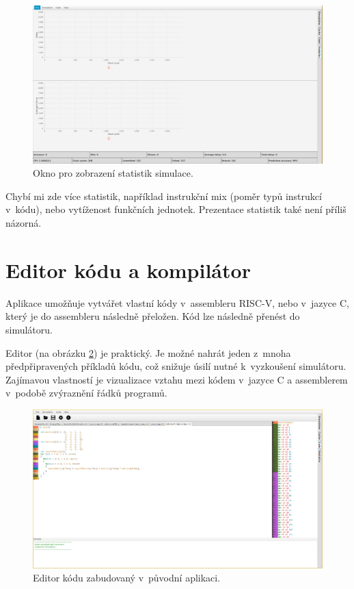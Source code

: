 \begin{figure}[hbtp]
    \includegraphics[width=\textwidth]{obrazky-figures/stats.png}
    \caption{Okno pro zobrazení statistik simulace. \cite{horkySim, vavraSim}}
    \label{stat_window}
\end{figure}

Chybí mi zde více statistik, například instrukční mix (poměr typů instrukcí v~kódu), nebo vytíženost funkčních jednotek.
Prezentace statistik také není příliš názorná.

\section{Editor kódu a kompilátor}
\label{inhouse_compiler}

Aplikace umožňuje vytvářet vlastní kódy v~assembleru RISC-V, nebo v~jazyce C, který je do assembleru následně přeložen.
Kód lze následně přenést do simulátoru.

Editor (na obrázku \ref{code_window}) je praktický.
Je možné nahrát jeden z~mnoha předpřipravených příkladů kódu, což snižuje úsilí nutné k~vyzkoušení simulátoru.
Zajímavou vlastností je vizualizace vztahu mezi kódem v~jazyce C a assemblerem v~podobě zvýraznění řádků programů.

\begin{figure}[hbtp]
    \includegraphics[width=\textwidth]{obrazky-figures/codeeditor.png}
    \caption{Editor kódu zabudovaný v~původní aplikaci.}
    \label{code_window}
\end{figure}

